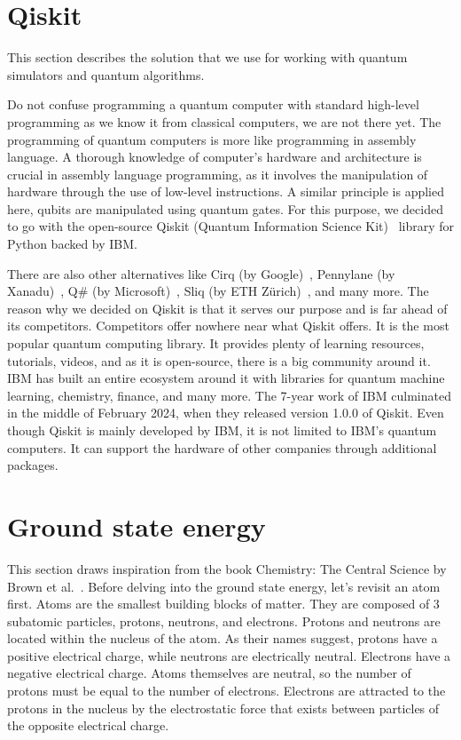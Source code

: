 \section{Qiskit}
This section describes the solution that we use for working with quantum simulators and quantum algorithms.

Do not confuse programming a quantum computer with standard high-level programming as we know it from classical computers, we are not there yet. The programming of quantum computers is more like programming in assembly language. A thorough knowledge of computer's hardware and architecture is crucial in assembly language programming, as it involves the manipulation of hardware through the use of low-level instructions. A similar principle is applied here, qubits are manipulated using quantum gates. For this purpose, we decided to go with the open-source Qiskit (Quantum Information Science Kit)~\cite{qiskit} library for Python backed by IBM.

There are also other alternatives like Cirq (by Google)~\cite{cirq}, Pennylane (by Xanadu)~\cite{pennylane}, Q\# (by Microsoft)~\cite{qsharp}, Sliq (by ETH Zürich)~\cite{sliq}, and many more. The reason why we decided on Qiskit is that it serves our purpose and is far ahead of its competitors. Competitors offer nowhere near what Qiskit offers. It is the most popular quantum computing library. It provides plenty of learning resources, tutorials, videos, and as it is open-source, there is a big community around it. IBM has built an entire ecosystem around it \cite{qiskit_ecosystem} with libraries for quantum machine learning, chemistry, finance, and many more. The 7-year work of IBM culminated in the middle of February 2024, when they released version 1.0.0 of Qiskit. Even though Qiskit is mainly developed by IBM, it is not limited to IBM's quantum computers. It can support the hardware of other companies through additional packages.

\section{Ground state energy}
This section draws inspiration from the book Chemistry: The Central Science by Brown et al.~\cite{chemistry}. Before delving into the ground state energy, let's revisit an atom first. Atoms are the smallest building blocks of matter. They are composed of 3 subatomic particles, protons, neutrons, and electrons. Protons and neutrons are located within the nucleus of the atom. As their names suggest, protons have a positive electrical charge, while neutrons are electrically neutral. Electrons have a negative electrical charge. Atoms themselves are neutral, so the number of protons must be equal to the number of electrons. Electrons are attracted to the protons in the nucleus by the electrostatic force that exists between particles of the opposite electrical charge.

